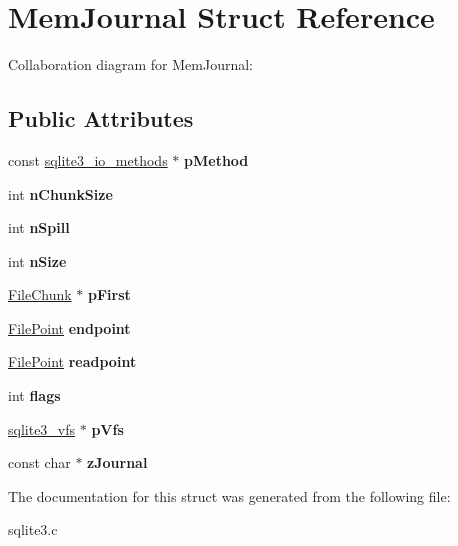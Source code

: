 \hypertarget{structMemJournal}{}\section{Mem\+Journal Struct Reference}
\label{structMemJournal}


Collaboration diagram for Mem\+Journal\+:
\subsection*{Public Attributes}
\begin{DoxyCompactItemize}
\item 
const \hyperlink{structsqlite3__io__methods}{sqlite3\+\_\+io\+\_\+methods} $\ast$ {\bfseries p\+Method}\hypertarget{structMemJournal_aad04f16d7faaeb548b3197cce7b0d37f}{}\label{structMemJournal_aad04f16d7faaeb548b3197cce7b0d37f}

\item 
int {\bfseries n\+Chunk\+Size}\hypertarget{structMemJournal_a15ba0375c0a30b355f5f7594e8804c1a}{}\label{structMemJournal_a15ba0375c0a30b355f5f7594e8804c1a}

\item 
int {\bfseries n\+Spill}\hypertarget{structMemJournal_afee076918f23dc1cd05681cb0504a77d}{}\label{structMemJournal_afee076918f23dc1cd05681cb0504a77d}

\item 
int {\bfseries n\+Size}\hypertarget{structMemJournal_a5c3de9e25d0e0a6fb36beec447de0c36}{}\label{structMemJournal_a5c3de9e25d0e0a6fb36beec447de0c36}

\item 
\hyperlink{structFileChunk}{File\+Chunk} $\ast$ {\bfseries p\+First}\hypertarget{structMemJournal_ade7a6dea7b38a8a86f33476ae207765f}{}\label{structMemJournal_ade7a6dea7b38a8a86f33476ae207765f}

\item 
\hyperlink{structFilePoint}{File\+Point} {\bfseries endpoint}\hypertarget{structMemJournal_ac69637f95cfbce175cbeef00f71e59a9}{}\label{structMemJournal_ac69637f95cfbce175cbeef00f71e59a9}

\item 
\hyperlink{structFilePoint}{File\+Point} {\bfseries readpoint}\hypertarget{structMemJournal_a5645d38e1a488b62b5f63112628bf472}{}\label{structMemJournal_a5645d38e1a488b62b5f63112628bf472}

\item 
int {\bfseries flags}\hypertarget{structMemJournal_a1fcfbcbb9da77a5cefef038b1b846f35}{}\label{structMemJournal_a1fcfbcbb9da77a5cefef038b1b846f35}

\item 
\hyperlink{structsqlite3__vfs}{sqlite3\+\_\+vfs} $\ast$ {\bfseries p\+Vfs}\hypertarget{structMemJournal_a5174aefb3d641db787fd1952e6e2fd7d}{}\label{structMemJournal_a5174aefb3d641db787fd1952e6e2fd7d}

\item 
const char $\ast$ {\bfseries z\+Journal}\hypertarget{structMemJournal_a60e0eed44abd876329d1f7d9a4c0d773}{}\label{structMemJournal_a60e0eed44abd876329d1f7d9a4c0d773}

\end{DoxyCompactItemize}


The documentation for this struct was generated from the following file\+:\begin{DoxyCompactItemize}
\item 
sqlite3.\+c\end{DoxyCompactItemize}
